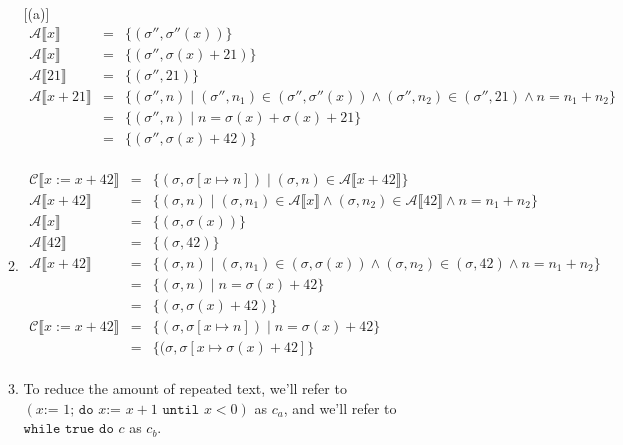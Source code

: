 \documentclass[10pt, oneside]{article}
\begin{document}
\begin{enumerate}[1.]
\begin{enumerate} [(a)]
\begin{eqnarray*}
       \mathcal{A} \llbracket x \rrbracket  & = & \{ (\sigma'', \sigma''(x)) \} \\
         \mathcal{A} \llbracket x \rrbracket  & = & \{ (\sigma'', \sigma(x) + 21) \} \\
    \mathcal{A} \llbracket 21 \rrbracket  & = & \{ (\sigma'', 21) \} \\
    \mathcal{A} \llbracket x + 21 \rrbracket & = & \{ (\sigma'', n) \mid (\sigma'', n_1) \in (\sigma'', \sigma''(x)) \wedge (\sigma'', n_2) \in (\sigma'', 21) \wedge n = n_1 + n_2 \} \\
    & = & \{ (\sigma'', n) \mid n = \sigma(x) + \sigma(x) + 21 \} \\
    & = & \{ (\sigma'', \sigma(x) + 42) \} \\
    \end{eqnarray*}

    \item  \begin{eqnarray*}  \mathcal{C} \llbracket x := x + 42 \rrbracket & = & \{ (\sigma, \sigma[x \mapsto n]) \mid (\sigma, n) \in \mathcal{A} \llbracket x + 42 \rrbracket \} \\
    \mathcal{A} \llbracket x + 42 \rrbracket & = & \{ (\sigma, n) \mid (\sigma, n_1) \in \mathcal{A} \llbracket x \rrbracket \wedge (\sigma, n_2) \in \mathcal{A} \llbracket 42 \rrbracket \wedge n = n_1 + n _2\} \\
    \mathcal{A} \llbracket x \rrbracket  & = & \{ (\sigma, \sigma(x)) \} \\
    \mathcal{A} \llbracket 42 \rrbracket  & = & \{ (\sigma, 42) \} \\
    \mathcal{A} \llbracket x + 42 \rrbracket & = & \{ (\sigma, n) \mid (\sigma, n_1) \in (\sigma, \sigma(x)) \wedge (\sigma, n_2) \in (\sigma, 42) \wedge n = n_1 + n_2 \} \\
    & = & \{ (\sigma, n) \mid n = \sigma(x) + 42 \} \\
    & = & \{ (\sigma, \sigma(x) + 42) \} \\
     \mathcal{C} \llbracket x := x + 42 \rrbracket & = & \{ (\sigma, \sigma[x \mapsto n]) \mid n = \sigma(x) + 42 \} \\
     & = &  \{ (\sigma, \sigma[x \mapsto \sigma(x) + 42 ]\} \\
   \end{eqnarray*}
    \item
      To reduce the amount of repeated text, we'll refer to 
      $(x \texttt{:= }1\texttt{; do } x \texttt{:= } x + 1 \texttt{ until } x < 0)$ 
      as $c_a$, and we'll refer to $\texttt{while true do } c$ as $c_b$. 
      

\end{enumerate}
\end{enumerate}
\end{document}
